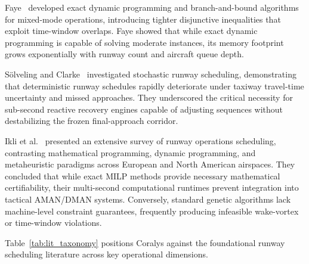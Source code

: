 \documentclass[10pt,journal,compsoc]{IEEEtran}
\begin{document}
Faye~\cite{faye2015,faye2018} developed exact dynamic programming and branch-and-bound algorithms for mixed-mode operations, introducing tighter disjunctive inequalities that exploit time-window overlaps. Faye showed that while exact dynamic programming is capable of solving moderate instances, its memory footprint grows exponentially with runway count and aircraft queue depth.

S{\"o}lveling and Clarke~\cite{solveling2014} investigated stochastic runway scheduling, demonstrating that deterministic runway schedules rapidly deteriorate under taxiway travel-time uncertainty and missed approaches. They underscored the critical necessity for sub-second reactive recovery engines capable of adjusting sequences without destabilizing the frozen final-approach corridor.

Ikli et al.~\cite{ikli2021} presented an extensive survey of runway operations scheduling, contrasting mathematical programming, dynamic programming, and metaheuristic paradigms across European and North American airspaces. They concluded that while exact MILP methods provide necessary mathematical certifiability, their multi-second computational runtimes prevent integration into tactical AMAN/DMAN systems. Conversely, standard genetic algorithms lack machine-level constraint guarantees, frequently producing infeasible wake-vortex or time-window violations.

Table~\ref{tab:lit_taxonomy} positions Coralys against the foundational runway scheduling literature across key operational dimensions.
\end{document}
